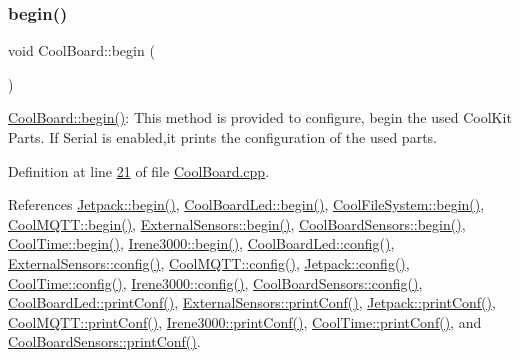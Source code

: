 \subsubsection{\texorpdfstring{begin()}{begin()}}
{\footnotesize\ttfamily void Cool\+Board\+::begin (\begin{DoxyParamCaption}{ }\end{DoxyParamCaption})}

\hyperlink{class_cool_board_acba7c5aef7268b2c0044bdb54d3b9d76}{Cool\+Board\+::begin()}\+: This method is provided to configure, begin the used Cool\+Kit Parts. If Serial is enabled,it prints the configuration of the used parts. 

Definition at line \hyperlink{_cool_board_8cpp_source_l00021}{21} of file \hyperlink{_cool_board_8cpp_source}{Cool\+Board.\+cpp}.



References \hyperlink{_jetpack_8cpp_source_l00024}{Jetpack\+::begin()}, \hyperlink{_cool_board_led_8cpp_source_l00113}{Cool\+Board\+Led\+::begin()}, \hyperlink{_cool_file_system_8cpp_source_l00022}{Cool\+File\+System\+::begin()}, \hyperlink{_cool_m_q_t_t_8cpp_source_l00026}{Cool\+M\+Q\+T\+T\+::begin()}, \hyperlink{_external_sensors_8cpp_source_l00030}{External\+Sensors\+::begin()}, \hyperlink{_cool_board_sensors_8cpp_source_l00085}{Cool\+Board\+Sensors\+::begin()}, \hyperlink{_cool_time_8cpp_source_l00030}{Cool\+Time\+::begin()}, \hyperlink{irene3000_8cpp_source_l00022}{Irene3000\+::begin()}, \hyperlink{_cool_board_led_8cpp_source_l00141}{Cool\+Board\+Led\+::config()}, \hyperlink{_external_sensors_8cpp_source_l00118}{External\+Sensors\+::config()}, \hyperlink{_cool_m_q_t_t_8cpp_source_l00340}{Cool\+M\+Q\+T\+T\+::config()}, \hyperlink{_jetpack_8cpp_source_l00183}{Jetpack\+::config()}, \hyperlink{_cool_time_8cpp_source_l00237}{Cool\+Time\+::config()}, \hyperlink{irene3000_8cpp_source_l00074}{Irene3000\+::config()}, \hyperlink{_cool_board_sensors_8cpp_source_l00222}{Cool\+Board\+Sensors\+::config()}, \hyperlink{_cool_board_led_8cpp_source_l00197}{Cool\+Board\+Led\+::print\+Conf()}, \hyperlink{_external_sensors_8cpp_source_l00273}{External\+Sensors\+::print\+Conf()}, \hyperlink{_jetpack_8cpp_source_l00308}{Jetpack\+::print\+Conf()}, \hyperlink{_cool_m_q_t_t_8cpp_source_l00358}{Cool\+M\+Q\+T\+T\+::print\+Conf()}, \hyperlink{irene3000_8cpp_source_l00210}{Irene3000\+::print\+Conf()}, \hyperlink{_cool_time_8cpp_source_l00318}{Cool\+Time\+::print\+Conf()}, and \hyperlink{_cool_board_sensors_8cpp_source_l00368}{Cool\+Board\+Sensors\+::print\+Conf()}.


